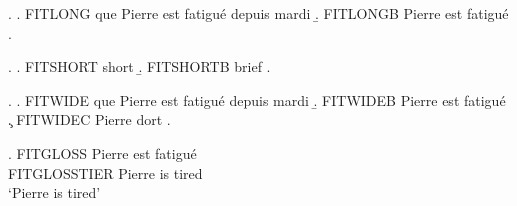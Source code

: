 \ex.
\a. FITLONG que Pierre est fatigué depuis mardi\exannot{[P1]}
\b. FITLONGB Pierre est fatigué\exannot{[P2]}
\z.

\ex.
\a. FITSHORT short\exannot{[P3]}
\b. FITSHORTB brief\exannot{[P4]}
\z.

\ex.
\a. FITWIDE que Pierre est fatigué depuis mardi\exannot{[P5]}
\b. FITWIDEB Pierre est fatigué
\c. FITWIDEC Pierre dort\exannot{[P7]}
\z.

\ex. \gll FITGLOSS Pierre est fatigué \exannot{[P8]}\\
          FITGLOSSTIER Pierre is tired\\
     \glt `Pierre is tired'

